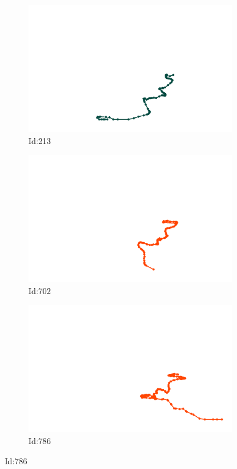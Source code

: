 \documentclass[12pt,twoside]{report}
\begin{document}
\begin{figure}
\centering
\begin{subfigure}[b]{0.20\textwidth}
\centering
\includegraphics[width=\textwidth]{../../trajectories/213.png}
\caption{Id:213}
\end{subfigure}
\begin{subfigure}[b]{0.20\textwidth}
\centering
\includegraphics[width=\textwidth]{../../trajectories/702.png}
\caption{Id:702}
\end{subfigure}
\begin{subfigure}[b]{0.20\textwidth}
\centering
\includegraphics[width=\textwidth]{../../trajectories/786.png}
\caption{Id:786}
\end{subfigure}
\end{figure}
\end{document}
